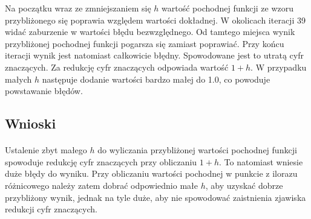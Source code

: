 \documentclass[a4paper]{article}
\begin{document}
 
 Na początku wraz ze zmniejszaniem się $h$ wartość pochodnej funkcji ze wzoru przybliżonego się poprawia względem wartości dokładnej. W okolicach iteracji 39 widać zaburzenie w wartości błędu bezwzględnego. Od tamtego miejsca wynik przybliżonej pochodnej funkcji pogarsza się zamiast poprawiać. Przy końcu iteracji wynik jest natomiast całkowicie błędny. Spowodowane jest to utratą cyfr znaczących. Za redukcję cyfr znaczących odpowiada wartość $1 + h$. W przypadku małych $h$ następuje dodanie wartości bardzo małej do 1.0, co powoduje powstawanie błędów.
\subsection{Wnioski}
\paragraph{}
Ustalenie zbyt małego $h$ do wyliczania przybliżonej wartości pochodnej funkcji spowoduje redukcję cyfr znaczących przy obliczaniu $1 + h$. To natomiast wniesie duże błędy do wyniku. Przy obliczaniu wartości pochodnej w punkcie z ilorazu różnicowego należy zatem dobrać odpowiednio małe $h$, aby uzyskać dobrze przybliżony wynik, jednak na tyle duże, aby nie spowodować zaistnienia zjawiska redukcji cyfr znaczących.
\end{document}
